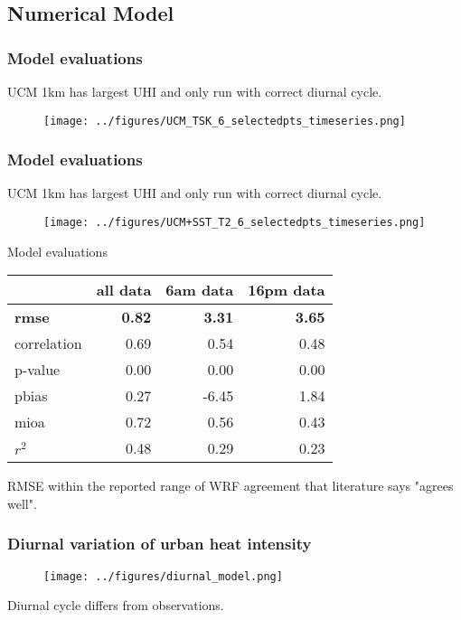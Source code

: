 \documentclass[aspectratio=169, 10pt]{beamer}
\begin{document}
\subsection{Numerical Model}


\begin{frame}
\frametitle{Model evaluations}
UCM 1km has largest UHI and only run with correct diurnal cycle. 
\begin{figure}
\texttt{[image: ../figures/UCM\_TSK\_6\_selectedpts\_timeseries.png]}
\end{figure}
\end{frame}

\begin{frame}
\frametitle{Model evaluations}
UCM 1km has largest UHI and only run with correct diurnal cycle. 
\begin{figure}
\texttt{[image: ../figures/UCM+SST\_T2\_6\_selectedpts\_timeseries.png]}
\end{figure}
\end{frame}

\begin{frame}{Model evaluations}
\center
\begin{tabular}{lrrr}
\toprule
{} &  all data &     6am data&   16pm data \\
\midrule
\bf rmse        &    \bf  0.82 & \bf 3.31 & \bf 3.65 \\
correlation &      0.69 &  0.54 & 0.48 \\
p-value     &      0.00 &  0.00 & 0.00 \\
pbias       &      0.27 & -6.45 & 1.84 \\
mioa        &      0.72 &  0.56 & 0.43 \\
$r^2$   &      0.48 &  0.29 & 0.23 \\
\bottomrule
\end{tabular}
RMSE within the reported range of WRF agreement that literature says "agrees well". 
\end{frame}

\begin{frame}
\frametitle{Diurnal variation of urban heat intensity}
\begin{figure}
\texttt{[image: ../figures/diurnal\_model.png]}
\end{figure}
Diurnal cycle differs from observations. 
\end{frame}
\end{document}
